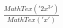 \documentclass[preview]{standalone}
\begin{document}
\begin{align*}
\dfrac{MathTex('2x^3')}{MathTex('x')}
\end{align*}
\end{document}
